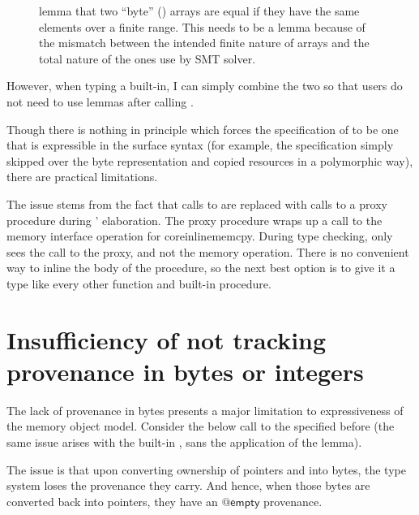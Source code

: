 \begin{figure}[h]
\caption{ lemma that two ``byte'' () arrays
    are equal if they have the same elements over a finite range. This needs
    to be a lemma because of the mismatch between the intended finite nature
    of arrays and the total nature of the ones use by SMT solver.}\label{fig:byte-array-eq-lemma}
\end{figure}

However, when typing a built-in, I can simply combine the two so that users do
not need to use lemmas after calling .

Though there is nothing in principle which forces the specification of
 to be one that is expressible in the surface syntax (for
example, the specification simply skipped over the byte representation and
copied resources in a polymorphic way), there are practical limitations.

The issue stems from the fact that calls to  are
replaced with calls to a proxy  procedure during '
elaboration. The proxy procedure wraps up a call to the memory interface
operation for coreinline{memcpy}. During type checking,  only
sees the call to the proxy, and not the memory operation. There is no
convenient way to inline the body of the procedure, so the next best
option is to give it a type like every other function and built-in
procedure.

\section{Insufficiency of not tracking provenance in bytes or integers}

The lack of provenance in bytes presents a major limitation to expressiveness
of the memory object model. Consider the below call to the
 specified before (the same issue arises with the built-in
, sans the application of the 
lemma).


The issue is that upon converting ownership of pointers  and
 into bytes, the type system loses the provenance they carry. And
hence, when those bytes are converted back into pointers, they have an
$@\mathsf{empty}$ provenance.

